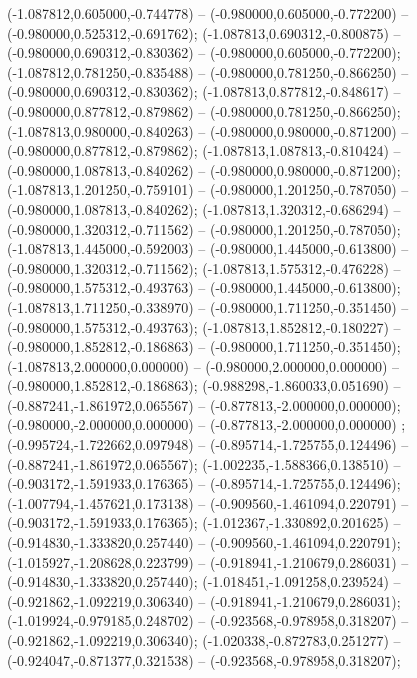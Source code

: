  (-1.087812,0.605000,-0.744778) -- (-0.980000,0.605000,-0.772200) -- (-0.980000,0.525312,-0.691762);
 (-1.087813,0.690312,-0.800875) -- (-0.980000,0.690312,-0.830362) -- (-0.980000,0.605000,-0.772200);
 (-1.087812,0.781250,-0.835488) -- (-0.980000,0.781250,-0.866250) -- (-0.980000,0.690312,-0.830362);
 (-1.087813,0.877812,-0.848617) -- (-0.980000,0.877812,-0.879862) -- (-0.980000,0.781250,-0.866250);
 (-1.087813,0.980000,-0.840263) -- (-0.980000,0.980000,-0.871200) -- (-0.980000,0.877812,-0.879862);
 (-1.087813,1.087813,-0.810424) -- (-0.980000,1.087813,-0.840262) -- (-0.980000,0.980000,-0.871200);
 (-1.087813,1.201250,-0.759101) -- (-0.980000,1.201250,-0.787050) -- (-0.980000,1.087813,-0.840262);
 (-1.087813,1.320312,-0.686294) -- (-0.980000,1.320312,-0.711562) -- (-0.980000,1.201250,-0.787050);
 (-1.087813,1.445000,-0.592003) -- (-0.980000,1.445000,-0.613800) -- (-0.980000,1.320312,-0.711562);
 (-1.087813,1.575312,-0.476228) -- (-0.980000,1.575312,-0.493763) -- (-0.980000,1.445000,-0.613800);
 (-1.087813,1.711250,-0.338970) -- (-0.980000,1.711250,-0.351450) -- (-0.980000,1.575312,-0.493763);
 (-1.087813,1.852812,-0.180227) -- (-0.980000,1.852812,-0.186863) -- (-0.980000,1.711250,-0.351450);
 (-1.087813,2.000000,0.000000) -- (-0.980000,2.000000,0.000000) -- (-0.980000,1.852812,-0.186863);
 (-0.988298,-1.860033,0.051690) -- (-0.887241,-1.861972,0.065567) -- (-0.877813,-2.000000,0.000000);
 (-0.980000,-2.000000,0.000000) -- (-0.877813,-2.000000,0.000000) ;
 (-0.995724,-1.722662,0.097948) -- (-0.895714,-1.725755,0.124496) -- (-0.887241,-1.861972,0.065567);
 (-1.002235,-1.588366,0.138510) -- (-0.903172,-1.591933,0.176365) -- (-0.895714,-1.725755,0.124496);
 (-1.007794,-1.457621,0.173138) -- (-0.909560,-1.461094,0.220791) -- (-0.903172,-1.591933,0.176365);
 (-1.012367,-1.330892,0.201625) -- (-0.914830,-1.333820,0.257440) -- (-0.909560,-1.461094,0.220791);
 (-1.015927,-1.208628,0.223799) -- (-0.918941,-1.210679,0.286031) -- (-0.914830,-1.333820,0.257440);
 (-1.018451,-1.091258,0.239524) -- (-0.921862,-1.092219,0.306340) -- (-0.918941,-1.210679,0.286031);
 (-1.019924,-0.979185,0.248702) -- (-0.923568,-0.978958,0.318207) -- (-0.921862,-1.092219,0.306340);
 (-1.020338,-0.872783,0.251277) -- (-0.924047,-0.871377,0.321538) -- (-0.923568,-0.978958,0.318207);
